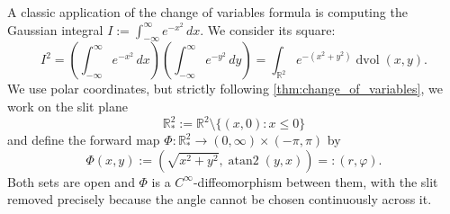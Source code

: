 \begin{example}
\label{ex:gaussian_integral_polar}
A classic application of the change of variables formula is computing the Gaussian integral $I := \int_{-\infty}^\infty e^{-x^2}\,dx$. We consider its square:
\[
I^2 = \left( \int_{-\infty}^\infty e^{-x^2}\,dx \right) \left( \int_{-\infty}^\infty e^{-y^2}\,dy \right) = \int_{\mathbb{R}^2} e^{-(x^2+y^2)} \mathop{d\text{vol}}(x,y).
\]
We use polar coordinates, but strictly following \cref{thm:change_of_variables}, we work on the
slit plane
\[\mathbb{R}^2_\ast := \mathbb{R}^2 \setminus \{(x,0) : x \leq 0\}\]
and define the forward map $\Phi: \mathbb{R}^2_\ast \to (0, \infty) \times (-\pi, \pi)$ by
\[
\Phi(x,y) := \left( \sqrt{x^2+y^2}, \operatorname{atan2}(y,x) \right) =: (r, \varphi).
\]
Both sets are open and $\Phi$ is a $C^\infty$-diffeomorphism between them, with the slit removed
precisely because the angle cannot be chosen continuously across it.


\end{example}
